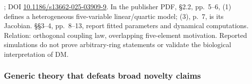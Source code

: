 \begin{description}[style=nextline,leftmargin=0pt,labelwidth=0pt,labelsep=0pt]
\item[S06: Nian and Li (2025).]
\cite{NianLi2025}; DOI \href{https://doi.org/10.1186/s13662-025-03909-9}{10.1186/s13662-025-03909-9}.
In the publisher PDF, \S2.2, pp.~5--6, (1) defines a heterogeneous
five-variable linear/quartic model; (3), p.~7, is its Jacobian.
\S\S3--4, pp.~8--13, report fitted parameters and dynamical computations.
Relation: orthogonal coupling law, overlapping five-element motivation.
Reported simulations do not prove arbitrary-ring statements or validate
the biological interpretation of DM.
\end{description}

\subsubsection{Generic theory that defeats broad novelty claims}
